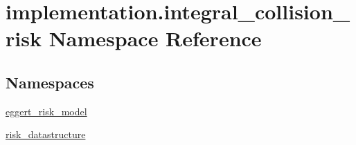 \hypertarget{namespaceimplementation_1_1integral__collision__risk}{}\section{implementation.\+integral\+\_\+collision\+\_\+risk Namespace Reference}
\label{namespaceimplementation_1_1integral__collision__risk}
\subsection*{Namespaces}
\begin{DoxyCompactItemize}
\item 
 \hyperlink{namespaceimplementation_1_1integral__collision__risk_1_1eggert__risk__model}{eggert\+\_\+risk\+\_\+model}
\item 
 \hyperlink{namespaceimplementation_1_1integral__collision__risk_1_1risk__datastructure}{risk\+\_\+datastructure}
\end{DoxyCompactItemize}
